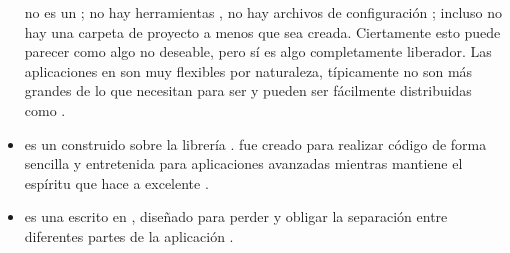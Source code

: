 \begin{itemize}
				\sinatraNAME no es un \frameworkPC; no hay herramientas \builtINPL \ormAS, no hay archivos de configuración \preFabCPT; incluso no hay una carpeta de proyecto a menos que sea creada. Ciertamente esto puede parecer como algo no deseable, pero sí es algo completamente liberador. Las aplicaciones en \sinatraNAME son muy flexibles por naturaleza, típicamente no son más grandes de lo que necesitan para ser y pueden ser fácilmente distribuidas como \rubyGemsAS  \cite{book_sinatra_oreilly}.



			\item
				\textbf{\padrinoNAME} es un \frameworkPC construido sobre la librería \webINT \sinatraNAME.  \padrinoNAME fue creado para realizar código de forma sencilla y entretenida para aplicaciones \webINT avanzadas mientras mantiene el espíritu que hace a \sinatraNAME excelente \cite{online_technology_padrino_officialsite}.

			
			\item
				\textbf{\djangoNAME} es una \frameworkPC \openSourcePC escrito en \pythonNAME, diseñado para perder \couplingAS y obligar la separación entre diferentes partes de la aplicación \cite{online_book_django_developmentpattern}.



\end{itemize}
